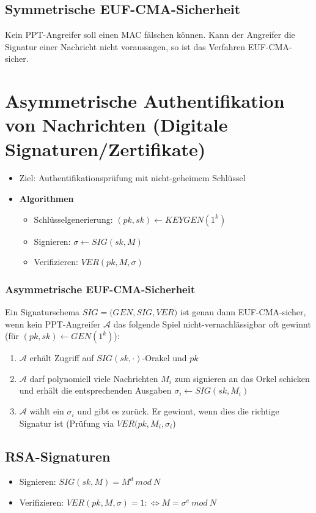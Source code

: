 \subsection{Symmetrische EUF-CMA-Sicherheit}
Kein PPT-Angreifer soll einen MAC fälschen können. Kann der Angreifer die Signatur einer Nachricht nicht voraussagen, so ist das Verfahren EUF-CMA-sicher.



\section{Asymmetrische Authentifikation von Nachrichten (Digitale Signaturen/Zertifikate)}
\begin{itemize}
 	\item Ziel: Authentifikationsprüfung mit nicht-geheimem Schlüssel
 	\item \textbf{Algorithmen}
 	\begin{itemize}
 		\item Schlüsselgenerierung: \((pk,sk) \leftarrow KEYGEN(1^k)\)
 		\item Signieren: \(\sigma \leftarrow SIG(sk,M)\)
 		\item Verifizieren: \(VER(pk,M,\sigma)\)
 	\end{itemize}
\end{itemize}

\subsubsection{Asymmetrische EUF-CMA-Sicherheit}
Ein Signaturschema \(SIG = \big(GEN,SIG,VER\big)\) ist genau dann EUF-CMA-sicher, wenn kein PPT-Angreifer \(\mathcal{A}\) das folgende Spiel nicht-vernachlässigbar oft gewinnt (für \((pk,sk) \leftarrow GEN(1^k)\)):
\begin{enumerate}
	\item \(\mathcal{A}\) erhält Zugriff auf \(SIG(sk,\cdot)\)-Orakel und \(pk\)
	\item \(\mathcal{A}\) darf polynomiell viele Nachrichten \(M_i\) zum signieren an das Orkel schicken und erhält die entsprechenden Ausgaben \(\sigma_i \leftarrow SIG(sk,M_i)\)
	\item \(\mathcal{A}\) wählt ein \(\sigma_i\) und gibt es zurück. Er gewinnt, wenn dies die richtige Signatur ist (Prüfung via \(VER(pk,M_i,\sigma_i\))
\end{enumerate}


\subsection{RSA-Signaturen}
\begin{itemize}
	\item Signieren: \(SIG(sk,M) = M^d~mod~N\)
	\item Verifizieren: \(VER(pk,M,\sigma)=1 :\Leftrightarrow M = \sigma^e~mod~N\)
\end{itemize}

